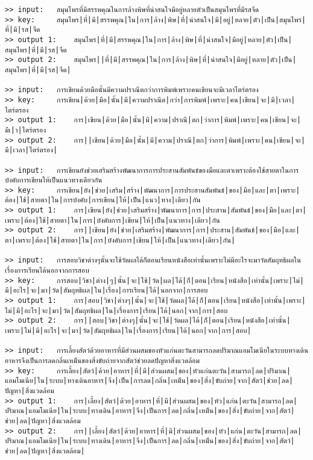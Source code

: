 \documentclass[11pt]{article}
\begin{document}
\begin{Verbatim}[commandchars=\\\{\}]
>> input:	สมุนไพรที่มีสรรพคุณในการล้างพิษที่น่าสนใจมีอยู่หลายตัวเป็นสมุนไพรที่มีรสจืด
>> key:		สมุนไพร|ที่|มี|สรรพคุณ|ใน|การ|ล้าง|พิษ|ที่|น่าสนใจ|มี|อยู่|หลาย|ตัว|เป็น|สมุนไพร|ที่|มี|รส|จืด
>> output 1:	สมุนไพร|ที่|มี|สรรพคุณ|ใน|การ|ล้าง|พิษ|ที่|น่าสนใจ|มีอยู่|หลาย|ตัว|เป็น|สมุนไพร|ที่|มี|รส|จืด
>> output 2:	สมุนไพร||ที่|มี|สรรพคุณ|ใน|การ|ล้าง|พิษ|ที่|น่าสนใจ|มีอยู่|หลาย|ตัว|เป็น|สมุนไพร|ที่|มี|รส|จืด|

>> input:	การเขียนด้วยมือนั้นมีความปราณีตกว่าการพิมพ์เพราะคนเขียนจะมีเวลาไตร่ตรอง
>> key:		การเขียน|ด้วย|มือ|นั้น|มี|ความปราณีต|กว่า|การพิมพ์|เพราะ|คน|เขียน|จะ|มี|เวลา|ไตร่ตรอง
>> output 1:	การ|เขียน|ด้วย|มือ|นั้น|มี|ความ|ปราณี|ตก|ว่าการ|พิมพ์|เพราะ|คน|เขียน|จะ|มีเ|า|ไตร่ตรอง
>> output 2:	การ||เขียน|ด้วย|มือ|นั้น|มี|ความ|ปราณี|ตก|ว่าการ|พิมพ์|เพราะ|คน|เขียน|จะ|มี|เวลา|ไตร่ตรอง|

>> input:	การเขียนยังช่วยเสริมสร้างพัฒนาการการประสานสัมพันธ์ของมือและตาเพราะต้องใช้สายตาในการบังคับการเขียนให้เป็นแนวทางเดียวกัน
>> key:		การเขียน|ยัง|ช่วย|เสริม|สร้าง|พัฒนาการ|การประสานสัมพันธ์|ของ|มือ|และ|ตา|เพราะ|ต้อง|ใช้|สายตา|ใน|การบังคับ|การเขียน|ให้|เป็น|แนว|ทาง|เดียว|กัน
>> output 1:	การ|เขียน|ยัง|ช่วย|เสริมสร้าง|พัฒนาการ|การ|ประสาน|สัมพันธ์|ของ|มือ|และ|ตา|เพราะ|ต้อง|ใช้|สายตา|ใน|การ|บังคับการ|เขียน|ให้|เป็น|แนวทาง|เดียว|กัน
>> output 2:	การ||เขียน|ยัง|ช่วย|เสริมสร้าง|พัฒนาการ|การ|ประสาน|สัมพันธ์|ของ|มือ|และ|ตา|เพราะ|ต้อง|ใช้|สายตา|ใน|การ|บังคับการ|เขียน|ให้|เป็น|แนวทาง|เดียว|กัน|

>> input:	การสอบวิชาต่างๆนั้นจะใช้วัดผลได้ก็ตอนเรียนหนังสือเท่านั้นเพราะไม่มีอะไรจะมาวัดสัมฤทธิผลในเรื่องการเรียนได้นอกจากการสอบ
>> key:		การสอบ|วิชา|ต่าง|ๆ|นั้น|จะ|ใช้|วัด|ผล|ได้|ก็|ตอน|เรียน|หนังสือ|เท่านั้น|เพราะ|ไม่|มี|อะไร|จะ|มา|วัด|สัมฤทธิผล|ใน|เรื่อง|การเรียน|ได้|นอกจาก|การสอบ
>> output 1:	การ|สอบ|วิชา|ต่างๆ|นั้น|จะ|ใช้|วัดผล|ได้|ก็|ตอน|เรียน|หนังสือ|เท่านั้น|เพราะ|ไม่|มี|อะไร|จะ|มา|วัด|สัมฤทธิผล|ใน|เรื่องการ|เรียน|ได้|นอก|จาก|การ|สอบ
>> output 2:	การ||สอบ|วิชา|ต่างๆ|นั้น|จะ|ใช้|วัดผล|ได้|ก็|ตอน|เรียน|หนังสือ|เท่านั้น|เพราะ|ไม่|มี|อะไร|จะ|มา|วัด|สัมฤทธิผล|ใน|เรื่องการ|เรียน|ได้|นอก|จาก|การ|สอบ|

>> input:	การเลี้ยงสัตว์ด้วยอาหารที่มีส่วนผสมของหัวแก่นตะวันสามารถลดปริมาณแอมโมเนียในระบบทางเดินอาหารจึงเป็นการลดกลิ่นเหม็นของสิ่งขับถ่ายจากสัตว์ช่วยลดปัญหาสิ่งแวดล้อม
>> key:		การเลี้ยง|สัตว์|ด้วย|อาหาร|ที่|มี|ส่วนผสม|ของ|หัวแก่นตะวัน|สามารถ|ลด|ปริมาณ|แอมโมเนีย|ใน|ระบบ|ทางเดินอาหาร|จึง|เป็น|การลด|กลิ่น|เหม็น|ของ|สิ่ง|ขับถ่าย|จาก|สัตว์|ช่วย|ลด|ปัญหา|สิ่งแวดล้อม
>> output 1:	การ|เลี้ยง|สัตว์|ด้วย|อาหาร|ที่|มี|ส่วนผสม|ของ|หัว|แก่น|ตะวัน|สามารถ|ลด|ปริมาณ|แอมโมเนีย|ใน|ระบบ|ทางเดิน|อาหาร|จึง|เป็นการ|ลด|กลิ่น|เหม็น|ของ|สิ่ง|ขับถ่าย|จาก|สัตว์|ช่วย|ลด|ปัญหา|สิ่งแวดล้อม
>> output 2:	การ||เลี้ยง|สัตว์|ด้วย|อาหาร|ที่|มี|ส่วนผสม|ของ|หัว|แก่น|ตะวัน|สามารถ|ลด|ปริมาณ|แอมโมเนีย|ใน|ระบบ|ทางเดิน|อาหาร|จึง|เป็นการ|ลด|กลิ่น|เหม็น|ของ|สิ่ง|ขับถ่าย|จาก|สัตว์|ช่วย|ลด|ปัญหา|สิ่งแวดล้อม|


\end{Verbatim}
\end{document}
